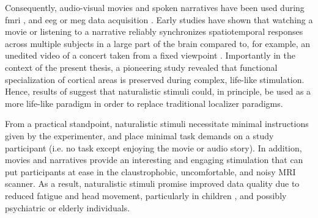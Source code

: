 Consequently, audio-visual movies and spoken narratives have been used during
\ac{fmri} \citep[cf.][for reviews]{hamilton2018revolution,
hasson2008neurocinematics, jaaskelainen2021movies, saarimaki2021naturalistic},
and \ac{eeg} or \ac{meg} data acquisition \citep[s.][for reviews]{alday2019meg,
kandylaki2019story}.
Early studies have shown that watching a movie \citep{hasson2004intersubject,
hasson2008neurocinematics, hasson2010reliability} or listening to a narrative
\citep{lerner2011topographic, wilson2008beyond} reliably synchronizes
spatiotemporal responses across multiple subjects in a large part of the brain
compared to, for example, an unedited video of a concert taken from a fixed
viewpoint \citep{hasson2004intersubject, hasson2008neurocinematics,
hasson2010reliability, lerner2011topographic, wilson2008beyond}.
Importantly in the context of the present thesis, a pioneering study
\citep{bartels2004mapping} revealed that functional specialization of cortical
areas is preserved during complex, life-like stimulation.
Hence, results of \citet{bartels2004mapping} suggest that naturalistic stimuli
could, in principle, be used as a more life-like paradigm in order to replace
traditional localizer paradigms.


From a practical standpoint, naturalistic stimuli necessitate minimal
instructions given by the experimenter, and place minimal task demands on a
study participant (i.e.  no task except enjoying the movie or audio story).
%
In addition, movies and narratives provide an interesting and engaging
stimulation that can put participants at ease in the claustrophobic,
uncomfortable, and noisy MRI scanner.
%
As a result, naturalistic stimuli promise improved data quality due to
reduced fatigue and head movement, particularly in children
\citep{vanderwal2015inscapes}, and possibly psychiatric
\citep{eickhoff2020towards} or elderly individuals.

